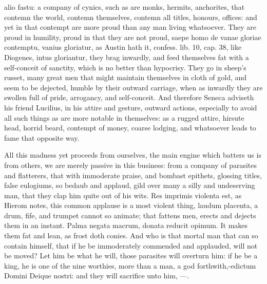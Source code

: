 {alio fastu: a company of cynics, such as are monks, hermits,
anchorites, that contemn the world, contemn themselves, contemn all
titles, honours, offices: and yet in that contempt are more proud than
any man living whatsoever. They are proud in humility, proud in that
they are not proud, saepe homo de vanae gloriae contemptu, vanius
gloriatur, as Austin hath it, confess. lib. 10, cap. 38, like Diogenes,
intus gloriantur, they brag inwardly, and feed themselves fat with a
self-conceit of sanctity, which is no better than hypocrisy. They go in
sheep's russet, many great men that might maintain themselves in cloth
of gold, and seem to be dejected, humble by their outward carriage,
when as inwardly they are swollen full of pride, arrogancy, and
self-conceit. And therefore Seneca adviseth his friend Lucilius,
in his attire and gesture, outward actions, especially to avoid
all such things as are more notable in themselves: as a rugged attire,
hirsute head, horrid beard, contempt of money, coarse lodging, and
whatsoever leads to fame that opposite way.

All this madness yet proceeds from ourselves, the main engine which
batters us is from others, we are merely passive in this business: from
a company of parasites and flatterers, that with immoderate praise, and
bombast epithets, glossing titles, false eulogiums, so bedaub and
applaud, gild over many a silly and undeserving man, that they clap him
quite out of his wits. Res imprimis violenta est, as Hierom notes, this
common applause is a most violent thing, laudum placenta, a drum, fife,
and trumpet cannot so animate; that fattens men, erects and dejects
them in an instant.  Palma negata macrum, donata reducit opimum.
It makes them fat and lean, as frost doth conies. And who is that
mortal man that can so contain himself, that if he be immoderately
commended and applauded, will not be moved? Let him be what he will,
those parasites will overturn him: if he be a king, he is one of the
nine worthies, more than a man, a god forthwith,-edictum Domini
Deique nostri: and they will sacrifice unto him,
---.

}
